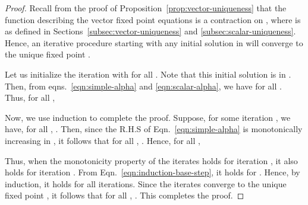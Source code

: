 \documentclass[12pt, draftclsnofoot, onecolumn]{IEEEtran}
\begin{document}
\begin{proof}
Recall from the proof of Proposition~\ref{prop:vector-uniqueness} that the function describing the vector fixed point equations is a contraction on , where  is as defined in Sections~\ref{subsec:vector-uniqueness} and \ref{subsec:scalar-uniqueness}. Hence, an iterative procedure starting with any initial solution in  will converge to the unique fixed point . 

Let us initialize the iteration with  for all . Note that this initial solution is in . Then, from eqns.~\eqref{eqn:simple-alpha} and \eqref{eqn:scalar-alpha}, we have  for all . Thus, for all ,


Now, we use induction to complete the proof. Suppose, for some iteration , we have, for all , . Then, since the R.H.S of Eqn.~\ref{eqn:simple-alpha} is monotonically increasing in , it follows that for all , . Hence, for all ,

Thus, when the monotonicity property of the iterates holds for iteration , it also holds for iteration . From Eqn.~\ref{eqn:induction-base-step}, it holds for . Hence, by induction, it holds for all iterations. Since the iterates converge to the unique fixed point , it follows that for all , . This completes the proof.
\end{proof}

\footnotesize

\end{document}
